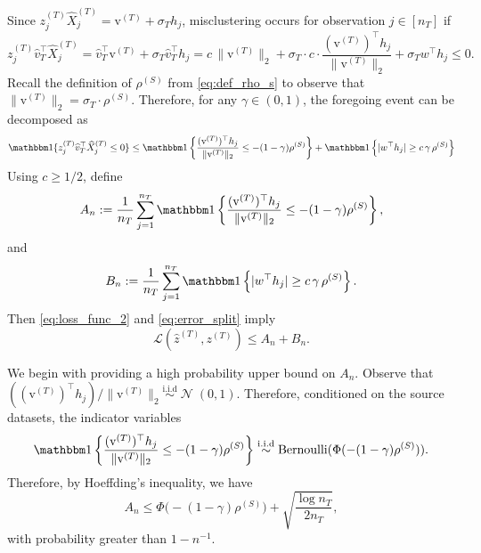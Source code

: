 \documentclass[10pt]{article}
\newcommand{\simiid}{\overset{\mathrm{i.i.d}}{\sim}}
\newcommand{\wh}{\widehat}
\DeclareMathOperator{\dnorm}{\mathcal N}
\newcommand{\trg}{T}
\newcommand{\nT}{n_{\trg}}
\newcommand{\sigmaT}{\sigma_{\trg}}
\newcommand{\ztar}{z^{(\trg)}}
\newcommand{\hatztar}{\wh{z}^{(\trg)}}
\newcommand{\rmqv}{\mathrm{v}^{(\trg)}}
\newcommand{\src}{S}
\begin{document}
Since $\ztar_j \wh{X}^{(\trg)}_j=\rmqv+\sigmaT h_j$, misclustering occurs for observation $j \in [\nT]$ if
\begin{equation}
\label{eq:margin_decomposition}
    \ztar_j \wh v^\top_\trg\wh{X}^{(\trg)}_j
    =\wh v^\top_\trg \rmqv+\sigmaT\wh v^\top_\trg h_j
    =c\,\|\rmqv\|_2+\sigmaT \cdot c \cdot \frac{(\rmqv)^\top h_j}{\|\rmqv\|_2}+\sigmaT w^\top h_j \le 0.
\end{equation}
Recall the definition of $\rho^{(\src)}$ from \eqref{eq:def_rho_s} to observe that $\|\rmqv\|_2=\sigmaT\cdot \rho^{(\src)}$.
Therefore, for any $\gamma \in (0,1)$, the foregoing event can be decomposed as
\begin{align}
\label{eq:error_split}
\mathbbm 1\{\ztar_j \wh v^\top_\trg\wh{X}^{(\trg)}_j \le 0\} \le \mathbbm 1\left\{\frac{(\rmqv)^\top h_j}{\|\rmqv\|_2}\le-(1-\gamma)\rho^{(\src)}\right\} + \mathbbm 1\left\{|w^\top h_j| \ge c\,\gamma\,\rho^{(\src)}\right\}
\end{align}
Using $c\ge1/2$, define
\[
A_n:=\frac{1}{\nT}\sum_{j =1}^{\nT}\mathbbm 1\left\{\frac{(\rmqv)^\top h_j}{\|\rmqv\|_2}\le-(1-\gamma)\rho^{(\src)}\right\},
\]
and
\[
B_n:=\frac{1}{\nT}\sum_{j =1}^{\nT}\mathbbm 1\left\{|w^\top h_j| \ge c\,\gamma\,\rho^{(\src)}\right\}.
\]
Then \eqref{eq:loss_func_2} and \eqref{eq:error_split} imply
\begin{equation}
\label{eq:loss_split}
    \mathcal L(\hatztar,\ztar)\le A_n+B_n.
\end{equation}

We begin with providing a high probability upper bound on $A_n$. Observe that $((\rmqv)^\top h_j)/\|\rmqv\|_2 \simiid \dnorm(0,1)$. Therefore, conditioned on the source datasets, the indicator variables 
\[
\mathbbm 1\left\{\frac{(\rmqv)^\top h_j}{\|\rmqv\|_2}\le-(1-\gamma)\rho^{(\src)}\right\} \simiid \mathrm{Bernoulli}(\Phi(-(1-\gamma)\rho^{(\src)})).
\]
Therefore, by Hoeffding's inequality, we have
\begin{equation}
\label{eq:hello_bound_1_a_n}
A_n \le \Phi\bigl(-(1-\gamma)\rho^{(\src)}\bigr)+\sqrt{\frac{\log \nT}{2\nT}},
\end{equation}
with probability greater than $1-n^{-1}$.
\end{document}
